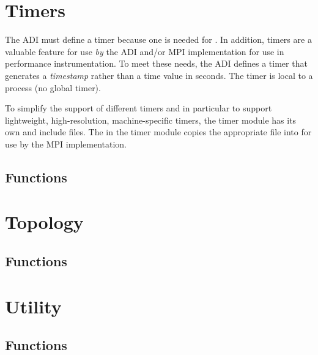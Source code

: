 \documentclass{article}
\begin{document}
\section{Timers}
\label{sec:timers}
The ADI must define a timer because one is needed for .  In
addition, timers are a valuable feature for use \emph{by} the ADI and/or MPI
implementation for use in performance instrumentation.  To meet these needs,
the ADI defines 
a timer that generates a 
\emph{timestamp} rather than a time value in seconds.  
The timer is local to a process (no global timer).

To simplify the support of different timers and in particular to
support lightweight, high-resolution, machine-specific timers, the
timer module has its own  and include files.  The
 in the timer module copies the appropriate
 file into  for use by the
MPI implementation.

\subsection{Functions}


\section{Topology}

\subsection{Functions}


\section{Utility}
\subsection{Functions}

 
\end{document}
